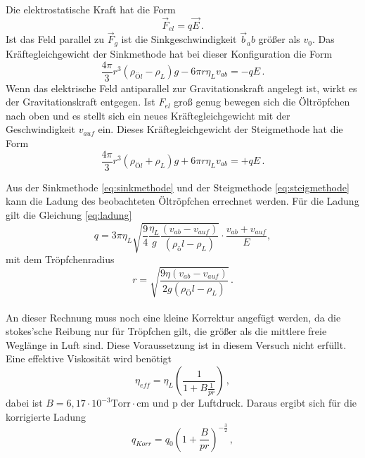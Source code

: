 Die elektrostatische Kraft hat die Form 
\begin{equation*}
    \vec{F}_{el} = q \vec{E}\, .
    \label{eq:Estat}
\end{equation*}
Ist das Feld parallel zu $\vec{F}_g$ ist die Sinkgeschwindigkeit $\vec{b}_ab$ größer als $v_0$.
Das Kräftegleichgewicht der Sinkmethode hat bei dieser Konfiguration die Form 
\begin{equation}
    \frac{4 \pi}{3} r^3(\rho_{Öl} - \rho_L)g - 6 \pi r \eta_L v_{ab} = - q E \, .
    \label{eq:sinkmethode}
\end{equation}
Wenn das elektrische Feld antiparallel zur Gravitationskraft angelegt ist, wirkt es der Gravitationskraft entgegen.
Ist $F_{el}$ groß genug bewegen sich die Öltröpfchen nach oben und es stellt sich ein neues Kräftegleichgewicht mit der Geschwindigkeit $v_{auf}$ ein.
Dieses Kräftegleichgewicht der Steigmethode hat die Form
\begin{equation}
    \frac{4 \pi}{3} r^3(\rho_{Öl} + \rho_L)g + 6 \pi r \eta_L v_{ab} = + q E \, .
    \label{eq:steigmethode}
\end{equation}

Aus der Sinkmethode \eqref{eq:sinkmethode} und der Steigmethode \eqref{eq:steigmethode} kann die Ladung des beobachteten Öltröpfchen errechnet werden.
Für die Ladung gilt die Gleichung \eqref{eq:ladung}
\begin{equation}
    q = 3 \pi \eta_L \sqrt{\frac{9}{4} \frac{\eta_L}{g} \frac{(v_{ab} - v_{auf})}{(\rho_öl - \rho_L)}} \cdot \frac{v_{ab}+ v_{auf}}{E} ,
    \label{eq:ladung}
\end{equation}
mit dem Tröpfchenradius 
\begin{equation}
    r = \sqrt{\frac{9 \eta (v_{ab}-v_{auf})}{2 g (\rho_Öl - \rho_L)}}\, .
    \label{eq:rmitEfled}
\end{equation} \\

An dieser Rechnung muss noch eine kleine Korrektur angefügt werden, da die stokes'sche Reibung nur für Tröpfchen gilt, die größer als die mittlere freie Weglänge in Luft sind.
Diese Voraussetzung ist in diesem Versuch nicht erfüllt. Eine effektive Viskosität wird benötigt
\begin{equation}
    \eta_{eff} = \eta_L \left( \frac{1}{1+ B \frac{1}{p r}}       \right) \, ,
    \label{eq:Veff}
\end{equation}
dabei ist $B = 6,17 \cdot 10^{-3} \text{Torr} \cdot \unit{\centi\meter}$ und p der Luftdruck. Daraus ergibt sich für die korrigierte Ladung
\begin{equation}
    q_{Korr} = q_0 (1 + \frac{B}{p r})^{-\frac{3}{2}}  \, ,
    \label{eq:qKorr}
\end{equation}
